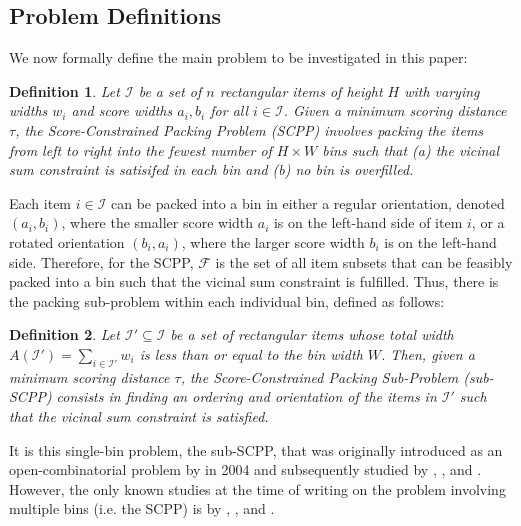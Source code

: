 \documentclass[a4paper,11pt,authoryear]{elsarticle}
\newtheorem{definition}{Definition}
\begin{document}
\subsection{Problem Definitions}
\label{sub:intro}

\noindent We now formally define the main problem to be investigated in this paper:

\begin{definition}
	Let $\mathcal{I}$ be a set of $n$ rectangular items of height $H$ with varying widths $w_i$ and score widths $a_i, b_i$ for all $i \in \mathcal{I}$. Given a minimum scoring distance $\tau$, the \emph{Score-Constrained Packing Problem (SCPP)} involves packing the items from left to right into the fewest number of $H \times W$ bins such that (a) the vicinal sum constraint is satisifed in each bin and (b) no bin is overfilled.
	\label{defn:scpp}
\end{definition}	

\noindent Each item $i \in \mathcal{I}$ can be packed into a bin in either a regular orientation, denoted $(a_i, b_i)$, where the smaller score width $a_i$ is on the left-hand side of item $i$, or a rotated orientation $(b_i, a_i)$, where the larger score width $b_i$ is on the left-hand side. Therefore, for the SCPP, $\mathcal{F}$ is the set of all item subsets that can be feasibly packed into a bin such that the vicinal sum constraint is fulfilled. Thus, there is the packing sub-problem within each individual bin, defined as follows:

\begin{definition}
	Let $\mathcal{I}' \subseteq \mathcal{I}$ be a set of rectangular items whose total width $A(\mathcal{I}') = \sum_{i \in \mathcal{I}'} w_i$ is less than or equal to the bin width $W$. Then, given a minimum scoring distance $\tau$, the \emph{Score-Constrained Packing Sub-Problem (sub-SCPP)} consists in finding an ordering and orientation of the items in $\mathcal{I}'$ such that the vicinal sum constraint is satisfied.
	\label{defn:subscp}
\end{definition}

\noindent It is this single-bin problem, the sub-SCPP, that was originally introduced as an open-combinatorial problem by \citeauthor{goulimis2004} in 2004 and subsequently studied by \cite{becker2010}, \cite{lewis2011}, and \cite{becker2015}. However, the only known studies at the time of writing on the problem involving multiple bins (i.e. the SCPP) is by \citet{lewis2011}, \cite{hawa2018}, and \citet{hawa2020t}.
\end{document}
